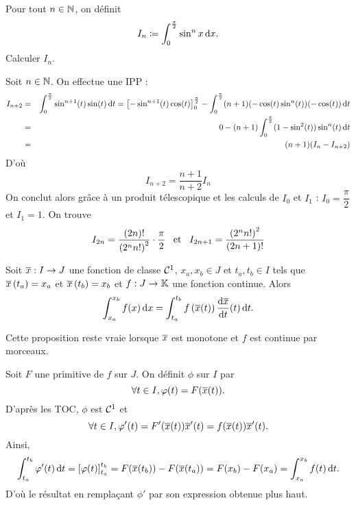 \documentclass{magnolia}
\begin{document}
\begin{exoUnique}
\exo[utile=3] Pour tout $n\in\mathbb{N}$, on définit
  \[I_n\coloneqq\int_{0}^{\frac{\pi}{2}} \sin^n x\,\text{d}x.\]
  Calculer $I_n$.
  \begin{sol}
  Soit $n\in\mathbb{N}$. On effectue une IPP :
\begin{eqnarray*}
I_{n+2}&=&\int_{0}^{\frac{\pi}{2}} \sin^{n+1} (t)\sin (t)\,\text{d}t=\left[-\sin^{n+1} (t) \cos (t)\right]_0^{\frac{\pi}{2}}-\int_{0}^{\frac{\pi}{2}} (n+1)(-\cos (t) \sin^n (t))(-\cos(t))\,\text{d}t\\
&=&0-(n+1)\int_{0}^{\frac{\pi}{2}} (1-\sin^2(t))\sin^n(t)\,\text{d}t\\
&=&(n+1)(I_n-I_{n+2})
\end{eqnarray*}
D'où $$I_{n+2}=\frac{n+1}{n+2}I_n$$ On conclut alors grâce à un produit télescopique et les calculs de $I_0$ et $I_1$ : $I_0=\dfrac{\pi}{2}$ et $I_1=1$.
  On trouve
  \[I_{2n}=\frac{\left(2n\right)!}{\left(2^n n!\right)^2}\cdot\frac{\pi}{2} \quad\!\text{et}\quad\!
    I_{2n+1}=\frac{\left(2^n n!\right)^2}{\left(2n+1\right)!}\]
  \end{sol}
\end{exoUnique}

\begin{proposition}[nom={Changement de variable}]
Soit $\overline{x}:I\to J$ une fonction de classe
$\mathcal{C}^{1}$, $x_a,x_b\in J$ et $t_a,t_b\in I$ tels que
$\overline{x}\left(t_a\right)=x_a$ et $\overline{x}\left(t_b\right)=x_b$ et $f:J\to\mathbb{K}$ une fonction continue. Alors
\[\int_{x_a}^{x_b} f(x)\,\text{d}x=\int_{t_a}^{t_b} f\left(\overline{x}(t)\right)
  \frac{\text{d}\overline{x}}{\text{d}t}(t)\,\text{d}t.\]
\end{proposition}

\begin{remarqueUnique}
\remarque Cette proposition reste vraie lorsque $\overline{x}$ est monotone et $f$ est continue par morceaux.
\end{remarqueUnique}

\begin{preuve}
Soit $F$ une primitive de $f$ sur $J$. On définit $\phi$ sur $I$ par $$\forall t \in I, \varphi(t)=F(\overline{x}(t)).$$
D'après les TOC, $\phi$ est $\mathcal{C}^{1}$ et $$\forall t \in I, \varphi'(t)=F'(\overline{x}(t))\overline{x}'(t)=f(\overline{x}(t))\overline{x}'(t).$$
Ainsi, $$\int_{t_a}^{t_b} \varphi'(t)\,\text{d}t=\left[ \varphi(t) \right]_{t_a}^{t_b}=F(\overline{x}(t_b))-F(\overline{x}(t_a))=F(x_b)-F(x_a)=\int_{x_a}^{x_b} f(t)\,\text{d}t.$$
D'où le résultat en remplaçant $\phi'$ par son expression obtenue plus haut.
\end{preuve}
\end{document}
